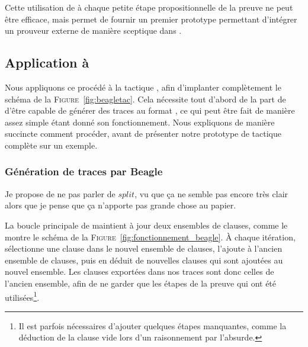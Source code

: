 Cette utilisation de \metistac à chaque petite étape propositionnelle de
la preuve ne peut être efficace, mais permet de fournir un premier
prototype permettant d'intégrer un prouveur externe de manière sceptique
dans \holfour.


\subsection{Application à \beagle}

Nous appliquons ce procédé à la tactique \beagletac, afin d'implanter
complètement le schéma de la \textsc{Figure}~\ref{fig:beagletac}. Cela
nécessite tout d'abord de la part de \beagle d'être capable de générer
des traces au format \tff, ce qui peut être fait de manière assez simple
étant donné son fonctionnement. Nous expliquons de manière succincte
comment procéder, avant de présenter notre prototype de tactique
\beagletac complète sur un exemple.


\subsubsection{Génération de traces par Beagle}
\todo Je propose de ne pas parler de $split$, vu que ça ne semble pas
encore très clair alors que je pense que ça n'apporte pas grande chose
au papier.

La boucle principale de \beagle maintient à jour deux ensembles de
clauses, comme le montre le schéma de la
\textsc{Figure}~\ref{fig:fonctionnement_beagle}. À chaque itération,
\beagle sélectionne une clause dans le nouvel ensemble de clauses,
l'ajoute à l'ancien ensemble de clauses, puis en déduit de nouvelles
clauses qui sont ajoutées au nouvel ensemble. Les clauses exportées dans
nos traces sont donc celles de l'ancien ensemble, afin de ne garder que
les étapes de la preuve qui ont été utilisées\footnote{Il est parfois
  nécessaires d'ajouter quelques étapes manquantes, comme la déduction
  de la clause vide lors d'un raisonnement par l'absurde.}.

